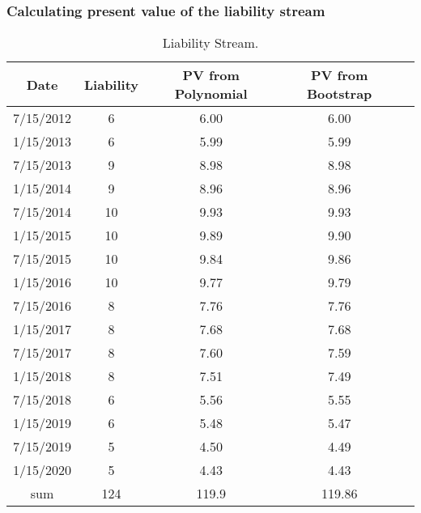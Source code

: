 \documentclass[compress,handout,10pt]{beamer}
\begin{document}
\begin{frame}
    \frametitle{Calculating present value of the liability stream}
\begin{table}[h]
\centering  
\begin{tabular}{ccccc}
\hline
Date  &Liability  &PV from Polynomial  &PV from Bootstrap\\ \hline  
7/15/2012  &6    &6.00                        &6.00                      \\
1/15/2013  &6    &5.99                      &5.99                  \\
7/15/2013  &9  &8.98                        &8.98                     \\
1/15/2014  &9  &8.96                       &8.96                     \\
7/15/2014  &10 &9.93                        &9.93                      \\
1/15/2015  &10 &9.89                        &9.90                     \\
7/15/2015  &10  &9.84                        &9.86                    \\
1/15/2016  &10  &9.77                        &9.79                      \\
7/15/2016  &8        &7.76                        &7.76                     \\                             
1/15/2017  &8      &7.68                        &7.68                     \\
7/15/2017  &8       &7.60                       &7.59                      \\
1/15/2018  &8       &7.51                       &7.49                     \\
7/15/2018  &6    &5.56                        &5.55                     \\ 
1/15/2019  &6      &5.48                       &5.47                     \\ 
7/15/2019  &5      &4.50                        &4.49                      \\ 
1/15/2020  &5       &4.43                       &4.43                      \\ \hline
sum       &124           &119.9                    &119.86

\end{tabular}
\caption{Liability Stream.}
\end{table}
\end{frame}
\end{document}
